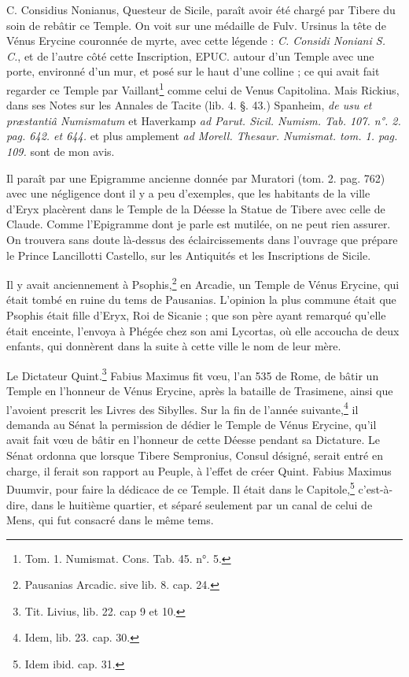 \documentclass[a4paper, 18pt, oneside]{article}
\begin{document}
C. Considius Nonianus, Questeur de Sicile, paraît avoir été chargé par Tibere du soin de rebâtir ce Temple. On voit sur une médaille de Fulv. Ursinus la tête de Vénus Erycine couronnée de myrte, avec cette légende : \emph{C. Considi Noniani S. C.}, et de l'autre côté cette Inscription, EPUC. autour d'un Temple avec une porte, environné d'un mur, et posé sur le haut d'une colline ; ce qui avait fait regarder ce Temple par Vaillant\footnote{Tom. 1. Numismat. Cons. Tab. 45. n°. 5.} comme celui de Venus Capitolina. Mais Rickius, dans ses Notes sur les Annales de Tacite (lib. 4. §. 43.) Spanheim, \emph{de usu et præstantiâ Numismatum} et Haverkamp \emph{ad Parut. Sicil. Numism. Tab. 107. n°. 2. pag. 642. et 644.} et plus amplement \emph{ad Morell. Thesaur. Numismat. tom. 1. pag. 109.} sont de mon avis.

Il paraît par une Epigramme ancienne donnée par Muratori (tom. 2. pag. 762) avec une négligence dont il y a peu d'exemples, que les habitants de la ville d'Eryx placèrent dans le Temple de la Déesse la Statue de Tibere avec celle de Claude. Comme l'Epigramme dont je parle est mutilée, on ne peut rien assurer. On trouvera sans doute là-dessus des éclaircissements dans l'ouvrage que prépare le Prince Lancillotti Castello, sur les Antiquités et les Inscriptions de Sicile.

Il y avait anciennement à Psophis,\footnote{Pausanias Arcadic. sive lib. 8. cap. 24.} en Arcadie, un Temple de Vénus Erycine, qui était tombé en ruine du tems de Pausanias. L'opinion la plus commune était que Psophis était fille d'Eryx, Roi de Sicanie ; que son père ayant remarqué qu'elle était enceinte, l'envoya à Phégée chez son ami Lycortas, où elle accoucha de deux enfants, qui donnèrent dans la suite à cette ville le nom de leur mère.

Le Dictateur Quint.\footnote{Tit. Livius, lib. 22. cap 9 et 10.} Fabius Maximus fit vœu, l'an 535 de Rome, de bâtir un Temple en l'honneur de Vénus Erycine, après la bataille de Trasimene, ainsi que l'avoient prescrit les Livres des Sibylles. Sur la fin de l'année suivante,\footnote{Idem, lib. 23. cap. 30.} il demanda au Sénat la permission de dédier le Temple de Vénus Erycine, qu'il avait fait vœu de bâtir en l'honneur de cette Déesse pendant sa Dictature. Le Sénat ordonna que lorsque Tibere Sempronius, Consul désigné, serait entré en charge, il ferait son rapport au Peuple, à l'effet de créer Quint. Fabius Maximus Duumvir, pour faire la dédicace de ce Temple. Il était dans le Capitole,\footnote{Idem ibid. cap. 31.} c'est-à-dire, dans le huitième quartier, et séparé seulement par un canal de celui de Mens, qui fut consacré dans le même tems.
\end{document}
